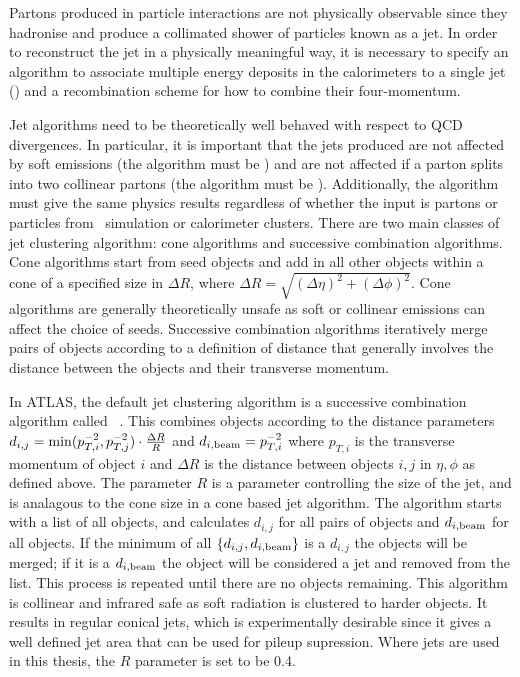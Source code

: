Partons produced in particle interactions are not physically observable since
they hadronise and produce a collimated shower of particles known as a jet. In
order to reconstruct the jet in a physically meaningful way, it is necessary to
specify an algorithm to associate multiple energy deposits in the calorimeters
to a single jet () and a recombination scheme for how to combine their
four-momentum. 

Jet algorithms need to be theoretically well behaved with respect to QCD
divergences. In particular, it is important that the jets produced are not
affected by soft emissions (the algorithm must be ) and
are not affected if a parton splits into two collinear partons (the algorithm
must be ). Additionally, the algorithm must give the same
physics results regardless of whether the input is partons or particles from
\mc\ simulation or calorimeter clusters. There are two main classes of
jet clustering algorithm: cone algorithms and successive combination algorithms.
Cone algorithms start from seed objects and add in all other objects within a
cone of a specified size in $\Delta R$, where $\Delta R = \sqrt{(\Delta \eta)^{2} + (\Delta
\phi)^{2}} $. Cone algorithms are generally theoretically unsafe as soft or
collinear emissions can affect the choice of seeds. Successive combination
algorithms iteratively merge pairs of objects according to a definition of distance that
generally involves the distance between the objects and their transverse
momentum.

In ATLAS, the default jet clustering algorithm is a successive combination
algorithm called \antikt~\cite{1126-6708-2008-04-063}. This combines objects
according to the distance parameters $d_{i,j} =
{\rm min}(p_{T,i}^{-2},p_{T,j}^{-2}) \cdot \frac{ \Delta R }{R}$ and $d_{i,\rm{beam}} =
p_{T,i}^{-2}$ where $p_{T,i}$ is the transverse momentum of object $i$ and
$\Delta R$ is the distance between objects $i,j$ in $\eta, \phi$ as defined above.
The parameter $R$ is a parameter controlling the size of the jet, and is
analagous to the cone size in a cone based jet algorithm. The algorithm starts
with a list of all objects, and calculates $d_{i,j}$ for all pairs of objects and
$d_{i,{\rm beam}}$ for all objects. If the minimum of all $\{ d_{i,j}, d_{i,{\rm
beam}} \}$ is a  $d_{i,j}$ the objects will be merged; if it is a $ d_{i,{\rm
beam}}$ the object will be considered a jet and removed from the list. This
process is repeated until there are no objects remaining. This algorithm is
collinear and infrared safe as soft radiation is clustered to harder objects. 
It results in regular conical jets, which is experimentally desirable
since it gives a well defined jet area that can be used for pileup supression.
Where jets are used in this thesis, the $R$ parameter is set to be 0.4.


